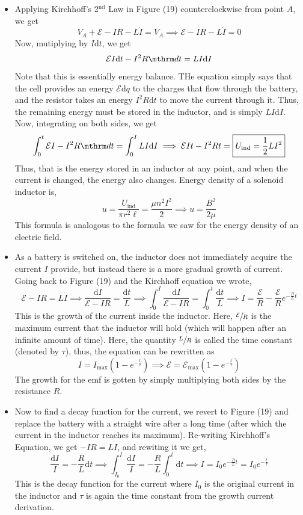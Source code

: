 \documentclass{scrartcl}
\begin{document}
\begin{itemize}
        \item Applying Kirchhoff's 2$^\text{nd}$ Law in Figure (19) counterclockwise from point $A$, we get \[V_A+\mathcal E-IR-L\dot I=V_A\implies\mathcal E-IR-L\dot I=0\] Now, mutiplying by $I\mathrm dt$, we get \[\mathcal EI\mathrm dt-I^2R\mthrm dt=LI\mathrm dI\] Note that this is essentially energy balance. THe equation simply says that the cell provides an energy $\mathcal E\mathrm dq$ to the charges that flow through the battery, and the resistor takes an energy $I^2R\mathrm dt$ to move the current through it. Thus, the remaining energy must be stored in the inductor, and is simply $LI\mathrm dI$. Now, integrating on both sides, we get \[\int_0^t\mathcal EI-I^2R\mthrm dt=\int_0^ILI\mathrm dI\implies\mathcal EIt-I^2Rt=\boxed{U_\text{ind}=\frac12LI^2}\] Thus, that is the energy stored in an inductor at any point, and when the current is changed, the energy also changes. Energy density of a solenoid inductor is, \[u=\frac{U_\text{ind}}{\pi r^2\ell}=\frac{\mu n^2I^2}2\implies\boxed{u=\frac{B^2}{2\mu}}\] This formula is analogous to the formula we saw for the energy density of an electric field.
        \item As a battery is switched on, the inductor does not immediately acquire the current $I$ provide, but instead there is a more gradual growth of current. Going back to Figure (19) and the Kirchhoff equation we wrote, \[\mathcal E-IR=L\dot I\implies\frac{\mathrm dI}{\mathcal E-IR}=\frac{\mathrm dt}L\implies\int_0^I\frac{\mathrm dI}{\mathcal E-IR}=\int_0^t\frac{\mathrm dt}L\implies\boxed{I=\frac{\mathcal E}R-\frac{\mathcal E}Re^{-\frac RLt}}\] This is the growth of the current inside the inductor. Here, $\sfrac{\mathcal E}R$ is the maximum current that the inductor will hold (which will happen after an infinite amount of time). Here, the quantity $\sfrac LR$ is called the time constant (denoted by $\tau$), thus, the equation can be rewritten as \[I=I_\text{max}\left(1-e^{-\frac t\tau}\right)\implies\boxed{\mathcal E=\mathcal E_\text{max}\left(1-e^{-\frac t\tau}\right)}\] The growth for the emf is gotten by simply multiplying both sides by the resistance $R$.
        \item Now to find a decay function for the current, we revert to Figure (19) and replace the battery with a straight wire after a long time (after which the current in the inductor reaches its maximum). Re-writing Kirchhoff's Equation, we get $-IR=L\dot I$, and rewiting it we get, \[\frac{\mathrm dI}I=-\frac RL\mathrm dt\implies\int_{I_0}^I\frac{\mathrm dI}I=-\frac RL\int_0^t\mathrm dt\implies\boxed{I=I_0e^{-\frac RLt}}=I_0e^{-\frac t\tau}\] This is the decay function for the current where $I_0$ is the original current in the inductor and $\tau$ is again the time constant from the growth current derivation.
    \end{itemize}
\end{document}
